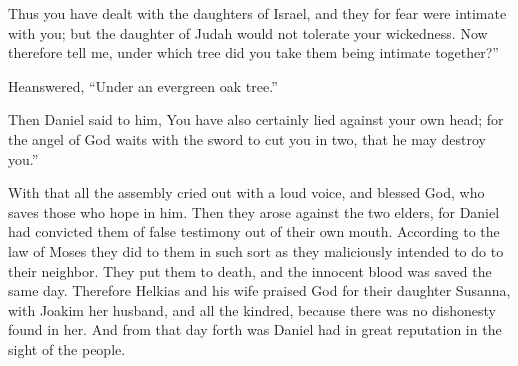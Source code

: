 {Thus you have dealt with the daughters of Israel, and they for fear were intimate with you; but the daughter of Judah would not tolerate your wickedness.
Now therefore tell me, under which tree did you take them being intimate together?”
\par }{\PP Heanswered, “Under an evergreen oak tree.”
\par }{\PP {}Then Daniel said to him, You have also certainly lied against your own head; for the angel of God waits with the sword to cut you in two, that he may destroy you.”
\par }{\PP {}With that all the assembly cried out with a loud voice, and blessed God, who saves those who hope in him.
Then they arose against the two elders, for Daniel had convicted them of false testimony out of their own mouth.
According to the law of Moses they did to them in such sort as they maliciously intended to do to their neighbor. They put them to death, and the innocent blood was saved the same day.
Therefore Helkias and his wife praised God for their daughter Susanna, with Joakim her husband, and all the kindred, because there was no dishonesty found in her.
And from that day forth was Daniel had in great reputation in the sight of the people.

\par }

